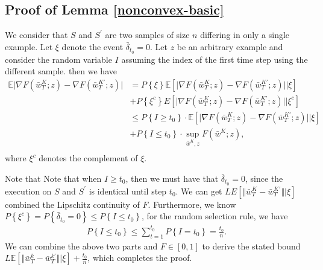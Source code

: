 \subsection{Proof of Lemma \ref{nonconvex-basic}}\label{proof-noncon-basic}
We consider that $S$ and $S^\prime$ are two samples of size $n$ differing in only a single example. Let $\xi$ denote the event $\bar{\delta}_{t_0}=0$. Let $z$ be an arbitrary example and consider the random variable $I$ assuming the index of the first time step using the different sample. then we have
    \begin{equation}
     \begin{aligned}
      \mathbb{E}\vert \nabla F(\bar{w}_T^{K};z)-\nabla F(\bar{w}^{K\prime}_T;z)\vert &= P\left\lbrace \xi\right\rbrace \mathbb{E}[\vert \nabla F(\bar{w}_T^{K};z)-\nabla F(\bar{w}^{K\prime}_T;z)\vert|\xi]\\
      &+P\left\lbrace \xi^{c}\right\rbrace E[\vert \nabla F(\bar{w}_T^{K};z)-\nabla F(\bar{w}^{K\prime}_T;z)\vert |\xi^{c}]\\
      &\leq P\left\lbrace I\geq t_0\right\rbrace \cdot \mathbb{E}[\vert \nabla F(\bar{w}_T^{K};z)-\nabla F(\bar{w}^{K\prime}_T;z)\vert |\xi] \\
      &+P\left\lbrace I\leq t_0\right\rbrace \cdot \mathop{sup}_{\bar{w}^{K},z} F(\bar{w}^{K};z),\\
     \end{aligned}
    \end{equation}
where $\xi^{c}$ denotes the complement of $\xi$.   

Note that Note that when $I\geq t_0$, then we must have that $\bar{\delta}_{t_0}=0$, since the execution on $S$ and $S^{\prime}$ is identical until step $t_0$. We can get $LE[\Vert\bar{w}_{T}^{K} - \bar{w}_{T}^{K\prime}\Vert|\xi]$ combined the Lipschitz continuity of $F$. Furthermore, we know $P\left\lbrace \xi^{c}\right\rbrace=P\left\lbrace \bar{\delta}_{t_0}=0\right\rbrace\leq P\left\lbrace I\leq t_0\right\rbrace$, for the random selection rule, we have 
    \begin{equation}
     \begin{aligned}
      P\left\lbrace I\leq t_0\right\rbrace \leq \sum_{t=1}^{t_0} P\left\lbrace I = t_0\right\rbrace = \frac{t_0}{n}.
     \end{aligned}
    \end{equation}
We can combine the above two parts and $F \in [0,1]$ to derive 
the stated bound $L\mathbb{E}[\Vert\bar{w}_{T}^{k} - \bar{w}_{T}^{k\prime}\Vert\vert\xi]+\frac{t_0}{n}$, which completes the proof.

